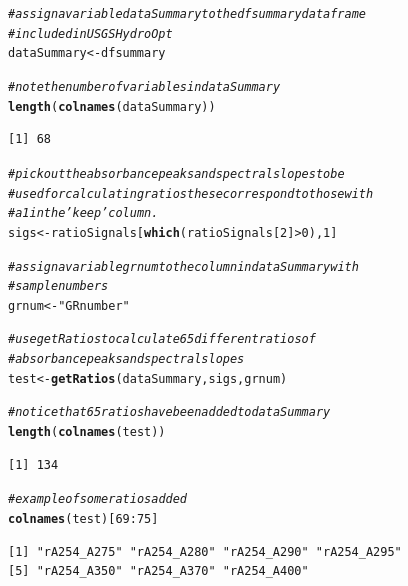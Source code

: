 \documentclass[a4paper,11pt]{article}\usepackage[]{graphicx}\usepackage[]{color}
\makeatletter
\newcommand{\hlnum}[1]{\textcolor[rgb]{0.686,0.059,0.569}{#1}}%
\newcommand{\hlstr}[1]{\textcolor[rgb]{0.192,0.494,0.8}{#1}}%
\newcommand{\hlcom}[1]{\textcolor[rgb]{0.678,0.584,0.686}{\textit{#1}}}%
\newcommand{\hlopt}[1]{\textcolor[rgb]{0,0,0}{#1}}%
\newcommand{\hlstd}[1]{\textcolor[rgb]{0.345,0.345,0.345}{#1}}%
\newcommand{\hlkwb}[1]{\textcolor[rgb]{0.69,0.353,0.396}{#1}}%
\newcommand{\hlkwd}[1]{\textcolor[rgb]{0.737,0.353,0.396}{\textbf{#1}}}%
\newenvironment{kframe}{%
 \def\at@end@of@kframe{}%
 \ifinner\ifhmode%
  \def\at@end@of@kframe{\end{minipage}}%
  \begin{minipage}{\columnwidth}%
 \fi\fi%
 \def\FrameCommand##1{\hskip\@totalleftmargin \hskip-\fboxsep
 \colorbox{shadecolor}{##1}\hskip-\fboxsep
     \hskip-\linewidth \hskip-\@totalleftmargin \hskip\columnwidth}%
 \MakeFramed {\advance\hsize-\width
   \@totalleftmargin\z@ \linewidth\hsize
   \@setminipage}}%
 {\par\unskip\endMakeFramed%
 \at@end@of@kframe}
\newenvironment{knitrout}{}{} %
\makeatother
\begin{document}
\begin{knitrout}
\color{fgcolor}\begin{kframe}
\begin{alltt}
\hlcom{# assign a variable dataSummary to the dfsummary dataframe}
\hlcom{# included in USGSHydroOpt}
\hlstd{dataSummary} \hlkwb{<-} \hlstd{dfsummary}

\hlcom{# note the number of variables in dataSummary}
\hlkwd{length}\hlstd{(}\hlkwd{colnames}\hlstd{(dataSummary))}
\end{alltt}
\begin{verbatim}
[1] 68
\end{verbatim}
\begin{alltt}
\hlcom{# pick out the absorbance peaks and spectral slopes to be}
\hlcom{# used for calculating ratios these correspond to those with}
\hlcom{# a 1 in the 'keep' column.}
\hlstd{sigs} \hlkwb{<-} \hlstd{ratioSignals[}\hlkwd{which}\hlstd{(ratioSignals[}\hlnum{2}\hlstd{]} \hlopt{>} \hlnum{0}\hlstd{),} \hlnum{1}\hlstd{]}

\hlcom{# assign a variable grnum to the column in dataSummary with}
\hlcom{# sample numbers}
\hlstd{grnum} \hlkwb{<-} \hlstr{"GRnumber"}

\hlcom{# use getRatios to calculate 65 different ratios of}
\hlcom{# absorbance peaks and spectral slopes}
\hlstd{test} \hlkwb{<-} \hlkwd{getRatios}\hlstd{(dataSummary, sigs, grnum)}

\hlcom{# notice that 65 ratios have been added to dataSummary}
\hlkwd{length}\hlstd{(}\hlkwd{colnames}\hlstd{(test))}
\end{alltt}
\begin{verbatim}
[1] 134
\end{verbatim}
\begin{alltt}
\hlcom{# example of some ratios added}
\hlkwd{colnames}\hlstd{(test)[}\hlnum{69}\hlopt{:}\hlnum{75}\hlstd{]}
\end{alltt}
\begin{verbatim}
[1] "rA254_A275" "rA254_A280" "rA254_A290" "rA254_A295"
[5] "rA254_A350" "rA254_A370" "rA254_A400"
\end{verbatim}
\end{kframe}
\end{knitrout}

\end{document}
